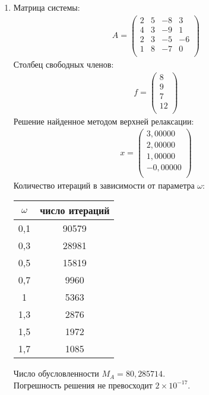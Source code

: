 \documentclass[a4paper,12pt,titlepage,finall]{article}
\begin{document}
\begin{enumerate}
\item
Матрица системы:
\begin{align*}
A = \begin{pmatrix}
2&           5&          -8&           3 \\
         4&           3&          -9&           1 \\
         2&           3&          -5&          -6 \\
         1&           8&          -7&           0 \\
\end{pmatrix}
\end{align*}
Столбец свободных членов:
\begin{align*}
f = \begin{pmatrix}
8 \\
         9 \\
         7 \\
        12 \\
\end{pmatrix}
\end{align*}
Решение найденное методом верхней релаксации:
\begin{align*}
x = \begin{pmatrix}
3,00000 \\
   2,00000 \\
   1,00000 \\
  -0,00000 \\
\end{pmatrix}
\end{align*}
Количество итераций в зависимости от параметра $\omega$:
\begin{center}
\begin{tabular}{|c|c|}
\hline
$\omega$ & число итераций\\
\hline
0,1 & 90579\\
0,3 & 28981\\
0,5 & 15819\\
0,7 & 9960\\
 1 & 5363\\
 1,3 & 2876\\
 1,5 & 1972\\
 1,7 & 1085\\
 \hline
\end{tabular}
\end{center}

Число обусловленности $M_A = 80,285714$.\\
Погрешность решения не превосходит $2 \times 10^{-17}$.


\end{enumerate}
\end{document}
